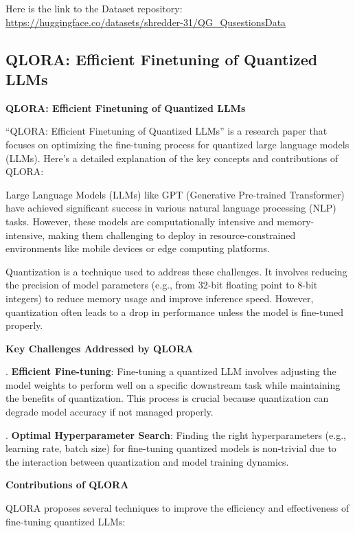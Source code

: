 \hfill \break
Here is the link to the Dataset repository: \url{https://huggingface.co/datasets/shredder-31/QG_QusestionsData}


\newpage
\subsection{QLORA: Efficient Finetuning of Quantized LLMs} 

\hfill \break
\textbf{QLORA: Efficient Finetuning of Quantized LLMs}

\hfill \break
``QLORA: Efficient Finetuning of Quantized LLMs'' \cite{dettmers2024qlora} is a research paper that focuses on optimizing the fine-tuning process for quantized large language models (LLMs). Here’s a detailed explanation of the key concepts and contributions of QLORA:


\hfill \break
Large Language Models (LLMs) like GPT (Generative Pre-trained Transformer) have achieved significant success in various natural language processing (NLP) tasks. However, these models are computationally intensive and memory-intensive, making them challenging to deploy in resource-constrained environments like mobile devices or edge computing platforms.

\hfill \break
Quantization is a technique used to address these challenges. It involves reducing the precision of model parameters (e.g., from 32-bit floating point to 8-bit integers) to reduce memory usage and improve inference speed. However, quantization often leads to a drop in performance unless the model is fine-tuned properly.

\hfill \break
\textbf{Key Challenges Addressed by QLORA}

\hfill {}. \textbf{Efficient Fine-tuning}: Fine-tuning a quantized LLM involves adjusting the model weights to perform well on a specific downstream task while maintaining the benefits of quantization. This process is crucial because quantization can degrade model accuracy if not managed properly.

\hfill {}. \textbf{Optimal Hyperparameter Search}: Finding the right hyperparameters (e.g., learning rate, batch size) for fine-tuning quantized models is non-trivial due to the interaction between quantization and model training dynamics.

\hfill \break
\textbf{Contributions of QLORA}

QLORA proposes several techniques to improve the efficiency and effectiveness of fine-tuning quantized LLMs:


